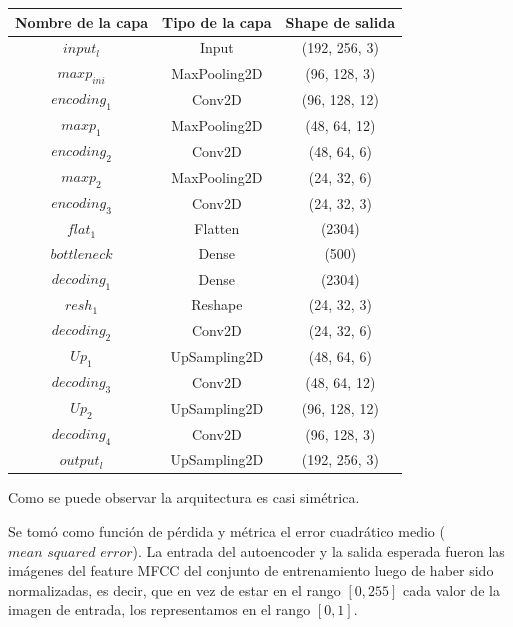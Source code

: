 \documentclass[colorinlistoftodos,twoside,twocolumn,10pt]{article} %
\begin{document}
\begin{center}
	\begin{tabular}{ | c | c | c |}
		\hline
		\textbf{Nombre de la capa} & \textbf{Tipo de la capa} & \textbf{Shape de salida} \\ \hline
		$input_l$ & Input & (192, 256, 3) \\ \hline
		$maxp_{ini}$ & MaxPooling2D & (96, 128, 3) \\ \hline
		$encoding_1$ & Conv2D & (96, 128, 12) \\ \hline
		$maxp_1$ & MaxPooling2D & (48, 64, 12) \\ \hline
		$encoding_2$ & Conv2D & (48, 64, 6) \\ \hline
		$maxp_2$ & MaxPooling2D & (24, 32, 6) \\ \hline
		$encoding_3$ & Conv2D & (24, 32, 3) \\ \hline
		$flat_1$ & Flatten & (2304) \\ \hline
		$bottleneck$ & Dense & (500) \\ \hline
		$decoding_1$ & Dense & (2304) \\ \hline
		$resh_1$ & Reshape & (24, 32, 3) \\ \hline
		$decoding_2$ & Conv2D & (24, 32, 6) \\ \hline
		$Up_1$ & UpSampling2D & (48, 64, 6) \\ \hline
		$decoding_3$ & Conv2D & (48, 64, 12) \\ \hline
		$Up_2$ & UpSampling2D & (96, 128, 12) \\ \hline
		$decoding_4$ & Conv2D & (96, 128, 3) \\ \hline
		$output_l$ & UpSampling2D & (192, 256, 3) \\
		\hline
	\end{tabular}
\end{center}

Como se puede observar la arquitectura es casi simétrica.

Se tomó como función de pérdida y métrica el error cuadrático medio ($\textit{mean squared error}$). La entrada del autoencoder y la salida esperada fueron las imágenes del feature MFCC del conjunto de entrenamiento luego de haber sido normalizadas, es decir, que en vez de estar en el rango $[0, 255]$ cada valor de la imagen de entrada, los representamos en el rango $[0, 1]$. 
\end{document}
